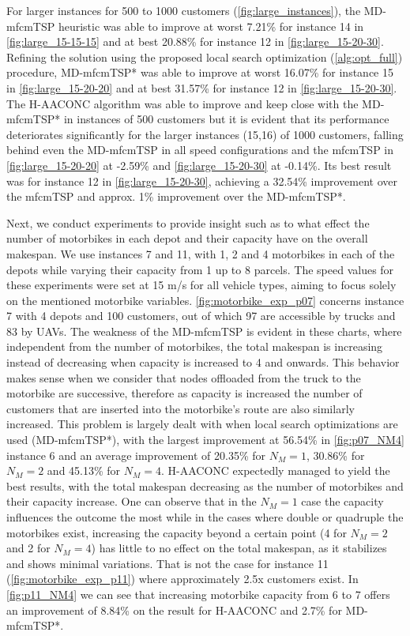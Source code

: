 \documentclass{article}
\begin{document}
	\par
	For larger instances for 500 to 1000 customers (\ref{fig:large_instances}), the MD-mfcmTSP heuristic was able to improve at worst 7.21\% for instance 14 in \autoref{fig:large_15-15-15} and at best 20.88\% for instance 12 in \autoref{fig:large_15-20-30}. Refining the solution using the proposed local search optimization (\autoref{alg:opt_full}) procedure, MD-mfcmTSP* was able to improve at worst 16.07\% for instance 15 in \autoref{fig:large_15-20-20} and at best 31.57\% for instance 12 in \autoref{fig:large_15-20-30}. The H-AACONC algorithm was able to improve and keep close with the MD-mfcmTSP* in instances of 500 customers but it is evident that its performance deteriorates significantly for the larger instances (15,16) of 1000 customers, falling behind even the MD-mfcmTSP in all speed configurations and the mfcmTSP in \autoref{fig:large_15-20-20} at -2.59\% and \ref{fig:large_15-20-30} at -0.14\%. Its best result was for instance 12 in \autoref{fig:large_15-20-30}, achieving a 32.54\% improvement over the mfcmTSP and approx. 1\% improvement over the MD-mfcmTSP*.
	\par 
	Next, we conduct experiments to provide insight such as to what effect the number of motorbikes in each depot and their capacity have on the overall makespan. We use instances 7 and 11, with 1, 2 and 4 motorbikes in each of the depots while varying their capacity from 1 up to 8 parcels. The speed values for these experiments were set at 15 m/s for all vehicle types, aiming to focus solely on the mentioned motorbike variables. \autoref{fig:motorbike_exp_p07} concerns instance 7 with 4 depots and 100 customers, out of which 97 are accessible by trucks and 83 by UAVs. The weakness of the MD-mfcmTSP is evident in these charts, where independent from the number of motorbikes, the total makespan is increasing instead of decreasing when capacity is increased to 4 and onwards. This behavior makes sense when we consider that nodes offloaded from the truck to the motorbike are successive, therefore as capacity is increased the number of customers that are inserted into the motorbike's route are also similarly increased. This problem is largely dealt with when local search optimizations are used (MD-mfcmTSP*), with the largest improvement at 56.54\% in \autoref{fig:p07_NM4} instance 6 and an average improvement of 20.35\% for $N_M=1$, 30.86\% for $N_M=2$ and 45.13\% for $N_M=4$. H-AACONC expectedly managed to yield the best results, with the total makespan decreasing as the number of motorbikes and their capacity increase. One can observe that in the $N_M=1$ case the capacity influences the outcome the most while in the cases where double or quadruple the motorbikes exist, increasing the capacity beyond a certain point (4 for $N_M=2$ and 2 for $N_M=4$) has little to no effect on the total makespan, as it stabilizes and shows minimal variations. That is not the case for instance 11 (\autoref{fig:motorbike_exp_p11}) where approximately 2.5x customers exist. In \autoref{fig:p11_NM4} we can see that increasing motorbike capacity from 6 to 7 offers an improvement of 8.84\% on the result for H-AACONC and 2.7\% for MD-mfcmTSP*.
\end{document}
